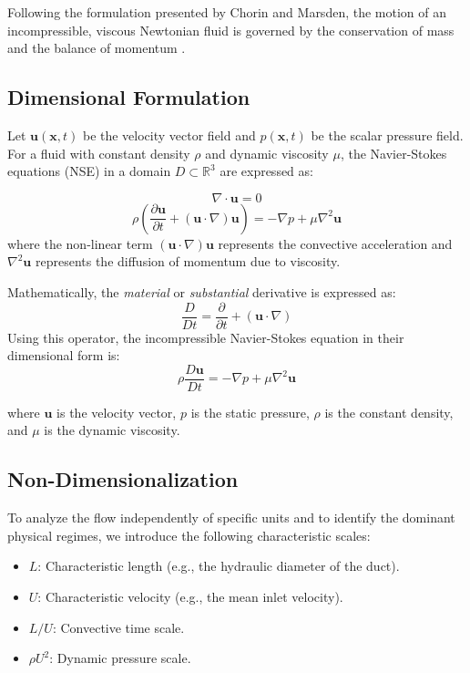 \documentclass[12pt, a4paper]{article}
\begin{document}
Following the formulation presented by Chorin and Marsden\footnotemark[1], the motion of an incompressible, viscous Newtonian fluid is governed by the conservation of mass and the balance of momentum \cite{chorin1993}. 



\subsection{Dimensional Formulation}
Let $\mathbf{u}(\mathbf{x}, t)$ be the velocity vector field and $p(\mathbf{x}, t)$ be the scalar pressure field. For a fluid with constant density $\rho$ and dynamic viscosity $\mu$, the Navier-Stokes equations (NSE) in a domain $D \subset \mathbb{R}^3$ are expressed as:

\begin{equation}
	\nabla \cdot \mathbf{u} = 0
\end{equation}
\begin{equation}
	\rho \left( \frac{\partial \mathbf{u}}{\partial t} + (\mathbf{u} \cdot \nabla)\mathbf{u} \right) = -\nabla p + \mu \nabla^2 \mathbf{u}
\end{equation}
where the non-linear term $(\mathbf{u} \cdot \nabla)\mathbf{u}$ represents the convective acceleration and $\nabla^2 \mathbf{u}$ represents the diffusion of momentum due to viscosity.

Mathematically, the \textit{material} or \textit{substantial} derivative is expressed as:
\begin{equation}
\frac{D}{Dt} = \frac{\partial}{\partial t} + (\mathbf{u} \cdot \nabla)
\end{equation}
Using this operator, the incompressible Navier-Stokes equation in their dimensional form is:
\begin{equation}
\rho \frac{D\mathbf{u}}{Dt} = -\nabla p + \mu \nabla^2 \mathbf{u}
\end{equation}

where $\mathbf{u}$ is the velocity vector, $p$ is the static pressure, $\rho$ is the constant density, and $\mu$ is the dynamic viscosity.


\subsection{Non-Dimensionalization}
To analyze the flow independently of specific units and to identify the dominant physical regimes, we introduce the following characteristic scales:
\begin{itemize}
	\item $L$: Characteristic length (e.g., the hydraulic diameter of the duct).
	\item $U$: Characteristic velocity (e.g., the mean inlet velocity).
	\item $L/U$: Convective time scale.
	\item $\rho U^2$: Dynamic pressure scale.
\end{itemize}
\end{document}

